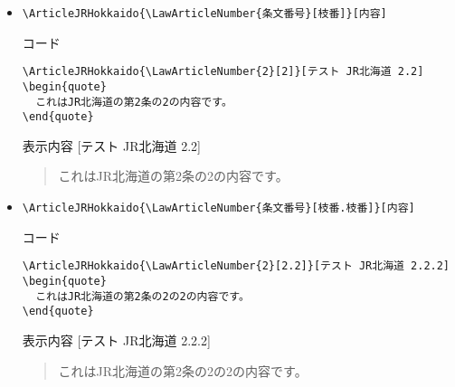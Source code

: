 \documentclass[oneside,10pt,a4paper]{jsarticle}
\begin{document}
\begin{itemize}
      \begin{itembox}[l]{コード}
        {\footnotesize\begin{verbatim}
\ArticleJRHokkaido{\LawArticleNumber{2}}[テスト JR北海道 2]
\begin{quote}
  これはJR北海道の第2条の内容です。
\end{quote}\end{verbatim}}
      \end{itembox}
      \begin{itembox}[l]{表示内容}
        [テスト JR北海道 2]
        \begin{quote}
          これはJR北海道の第2条の内容です。
        \end{quote}
      \end{itembox}
    \item \verb|\ArticleJRHokkaido{\LawArticleNumber{条文番号}[枝番]}[内容]|
      \begin{itembox}[l]{コード}
        {\footnotesize\begin{verbatim}
\ArticleJRHokkaido{\LawArticleNumber{2}[2]}[テスト JR北海道 2.2]
\begin{quote}
  これはJR北海道の第2条の2の内容です。
\end{quote}\end{verbatim}}
      \end{itembox}
      \begin{itembox}[l]{表示内容}
        [テスト JR北海道 2.2]
        \begin{quote}
          これはJR北海道の第2条の2の内容です。
        \end{quote}
      \end{itembox}
    \item \verb|\ArticleJRHokkaido{\LawArticleNumber{条文番号}[枝番.枝番]}[内容]|
      \begin{itembox}[l]{コード}
        {\footnotesize\begin{verbatim}
\ArticleJRHokkaido{\LawArticleNumber{2}[2.2]}[テスト JR北海道 2.2.2]
\begin{quote}
  これはJR北海道の第2条の2の2の内容です。
\end{quote}\end{verbatim}}
      \end{itembox}
      \begin{itembox}[l]{表示内容}
        [テスト JR北海道 2.2.2]
        \begin{quote}
          これはJR北海道の第2条の2の2の内容です。
        \end{quote}
      \end{itembox}
  \end{itemize}
  \newpage
\end{document}
